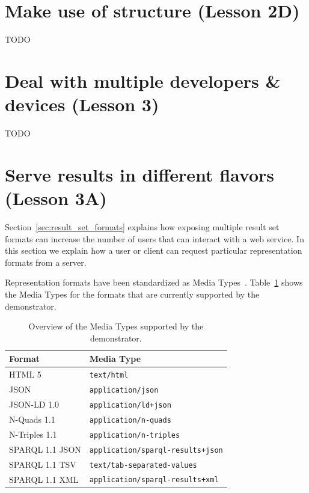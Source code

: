 \documentclass[a4paper]{scrartcl}
\newcommand{\textt}[1]{{\small \texttt{#1}}}
\begin{document}
\section{Make use of structure (Lesson 2D)}

TODO

\section{Deal with multiple developers \& devices (Lesson 3)}

TODO

\section{Serve results in different flavors (Lesson 3A)}

Section~\ref{sec:result_set_formats} explains how exposing multiple
result set formats can increase the number of users that can interact
with a web service.  In this section we explain how a user or client
can request particular representation formats from a server.

Representation formats have been standardized as Media
Types~\cite{RFC6838}.  Table~\ref{tab:media_type} shows the Media
Types for the formats that are currently supported by the
demonstrator.

\begin{table}
  \begin{tabular}{|l|l|}
    \hline
    \textbf{Format} & \textbf{Media Type} \\
    \hline
    \hline
    HTML 5          & \textt{text/html} \\
    \hline
    JSON            & \textt{application/json} \\
    \hline
    JSON-LD 1.0     & \textt{application/ld+json} \\
    \hline
    N-Quads 1.1     & \textt{application/n-quads} \\
    \hline
    N-Triples 1.1   & \textt{application/n-triples} \\
    \hline
    SPARQL 1.1 JSON & \textt{application/sparql-results+json} \\
    \hline
    SPARQL 1.1 TSV  & \textt{text/tab-separated-values} \\
    \hline
    SPARQL 1.1 XML  & \textt{application/sparql-results+xml} \\
  \end{tabular}
  \caption{Overview of the Media Types supported by the demonstrator.}
  \label{tab:media_type}
\end{table}
\end{document}
